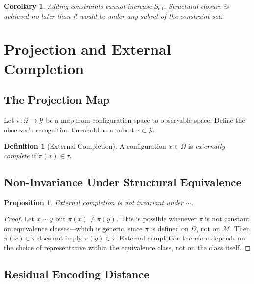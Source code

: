 \documentclass[11pt, twoside]{article}
\theoremstyle{plain}
\newtheorem{proposition}[theorem]{Proposition}
\newtheorem{corollary}[theorem]{Corollary}
\theoremstyle{definition}
\newtheorem{definition}[theorem]{Definition}
\theoremstyle{remark}
\newcommand{\Seff}{S_{\text{eff}}}
\begin{document}
\begin{corollary}
Adding constraints cannot increase $\Seff$. Structural closure is achieved no later than it would be under any subset of the constraint set.
\end{corollary}

\section{Projection and External Completion}
\label{app:projection}

\subsection{The Projection Map}

Let $\pi : \Omega \to \mathcal{Y}$ be a map from configuration space to observable space. Define the observer's recognition threshold as a subset $\tau \subset \mathcal{Y}$.

\begin{definition}[External Completion]
A configuration $x \in \Omega$ is \emph{externally complete} if $\pi(x) \in \tau$.
\end{definition}

\subsection{Non-Invariance Under Structural Equivalence}

\begin{proposition}
External completion is not invariant under $\sim$.
\end{proposition}

\begin{proof}
Let $x \sim y$ but $\pi(x) \neq \pi(y)$. This is possible whenever $\pi$ is not constant on equivalence classes---which is generic, since $\pi$ is defined on $\Omega$, not on $\mathcal{M}$. Then $\pi(x) \in \tau$ does not imply $\pi(y) \in \tau$. External completion therefore depends on the choice of representative within the equivalence class, not on the class itself.
\end{proof}

\subsection{Residual Encoding Distance}
\end{document}
